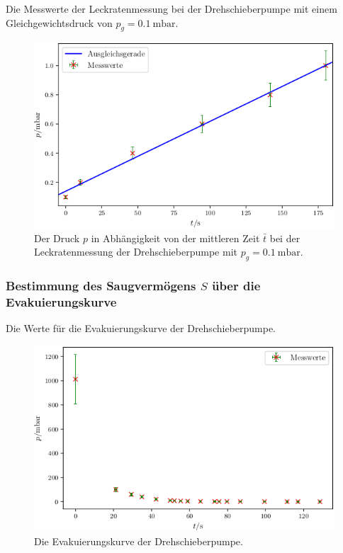 \begin{table}
\centering
\caption{Die Messwerte der Leckratenmessung bei der Drehschieberpumpe mit einem Gleichgewichtsdruck von $p_g = \SI{0.1}{\milli\bar}$.}

\label{tab:DL4}
\end{table}

\begin{figure}
\centering
\includegraphics[width=\linewidth-70pt,height=\textheight-70pt,keepaspectratio]{content/images/DL4.png}
\caption{Der Druck $p$ in Abhängigkeit von der mittleren Zeit $\bar{t}$ bei der Leckratenmessung der Drehschieberpumpe  mit $p_g = \SI{0.1}{\milli\bar}$.}
\label{fig:DL4}
\end{figure}

\subsubsection{Bestimmung des Saugvermögens $S$ über die Evakuierungskurve}

\begin{table}
\centering
\caption{Die Werte für die Evakuierungskurve der Drehschieberpumpe.}

\label{tab:DS}
\end{table}

\begin{figure}
\centering
\includegraphics[width=\linewidth-70pt,height=\textheight-70pt,keepaspectratio]{content/images/DSE.png}
\caption{Die Evakuierungskurve der Drehschieberpumpe.}
\label{fig:DSE}
\end{figure}

